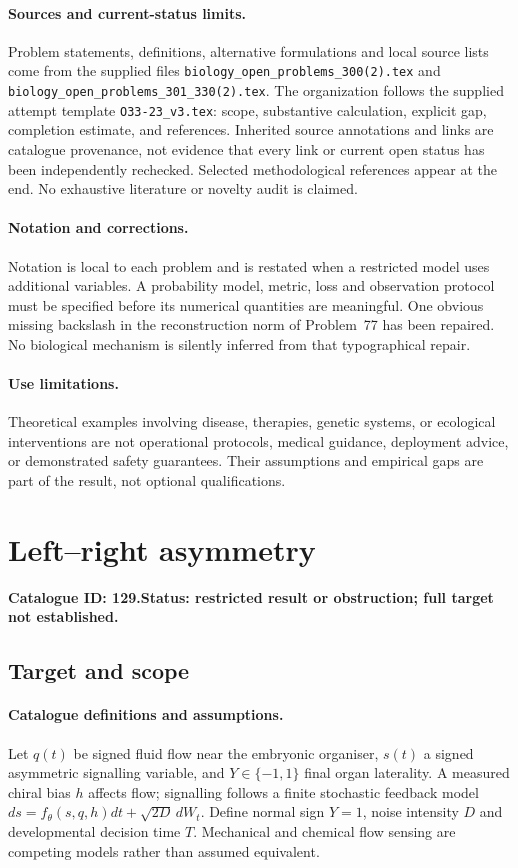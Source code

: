 \documentclass[11pt]{article}
\begin{document}
\paragraph{Sources and current-status limits.}
Problem statements, definitions, alternative formulations and local source lists
come from the supplied files
\texttt{biology\_open\_problems\_300(2).tex} and
\texttt{biology\_open\_problems\_301\_330(2).tex}.
The organization follows the supplied attempt template
\texttt{O33-23\_v3.tex}: scope, substantive calculation, explicit gap,
completion estimate, and references. Inherited source annotations and links are
catalogue provenance, not evidence that every link or current open status has
been independently rechecked. Selected methodological references appear at the
end. No exhaustive literature or novelty audit is claimed.

\paragraph{Notation and corrections.}
Notation is local to each problem and is restated when a restricted model uses
additional variables. A probability model, metric, loss and observation protocol
must be specified before its numerical quantities are meaningful. One obvious
missing backslash in the reconstruction norm of Problem~77 has been repaired.
No biological mechanism is silently inferred from that typographical repair.

\paragraph{Use limitations.}
Theoretical examples involving disease, therapies, genetic systems, or ecological
interventions are not operational protocols, medical guidance, deployment advice,
or demonstrated safety guarantees. Their assumptions and empirical gaps are part
of the result, not optional qualifications.

\setcounter{section}{128}
\section{Left--right asymmetry}
\label{prob:129}
\noindent\textbf{Catalogue ID: 129.}\quad \textbf{Status: restricted result or obstruction; full target not established.}
\subsection{Target and scope}
\paragraph{Catalogue definitions and assumptions.}
Let $q(t)$ be signed fluid flow near the embryonic organiser, $s(t)$ a signed asymmetric signalling variable, and $Y\in\{-1,1\}$ final organ laterality. A measured chiral bias $h$ affects flow; signalling follows a finite stochastic feedback model $ds=f_\theta(s,q,h)dt+\sqrt{2D}\,dW_t$. Define normal sign $Y=1$, noise intensity $D$ and developmental decision time $T$. Mechanical and chemical flow sensing are competing models rather than assumed equivalent.
\end{document}
